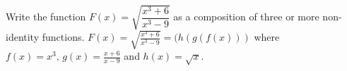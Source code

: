 {Write the function $F(x) = \sqrt{\dfrac{x^{3} + 6}{x^{3} - 9}}$ as a composition of three or more non-identity functions.}
{$F(x) = \sqrt{\frac{x^{3} + 6}{x^{3} - 9}} = (h(g(f(x)))$ where $f(x) = x^{3}, \, g(x) = \frac{x + 6}{x - 9}$ and $h(x) = \sqrt{x}$.}